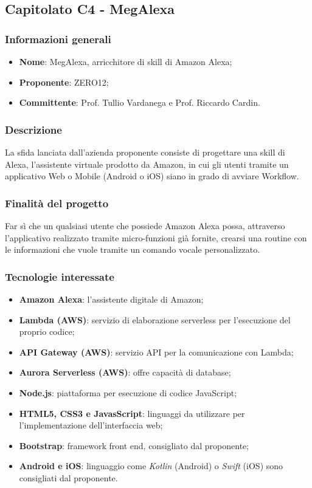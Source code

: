 \subsection{Capitolato C4 - MegAlexa}
\subsubsection{Informazioni generali}
\begin{itemize}
	\item \textbf{Nome}: MegAlexa, arricchitore di skill di Amazon Alexa;
	\item \textbf{Proponente}: ZERO12;
	\item \textbf{Committente}: Prof. Tullio Vardanega e Prof. Riccardo Cardin.
\end{itemize}
\subsubsection{Descrizione}
La sfida lanciata dall’azienda proponente consiste di progettare una skill di Alexa, l’assistente virtuale prodotto da Amazon, in cui gli utenti tramite un applicativo Web o Mobile (Android o iOS) siano in grado di avviare Workflow.
\subsubsection{Finalità del progetto}
Far sì che un qualsiasi utente che possiede Amazon Alexa possa, attraverso l’applicativo realizzato tramite micro-funzioni già fornite, crearsi una routine con le informazioni che vuole tramite un comando vocale personalizzato.
\subsubsection{Tecnologie interessate}
\begin{itemize}
	\item \textbf{Amazon Alexa}: l'assistente digitale di Amazon;
	\item \textbf{Lambda (AWS)}: servizio di elaborazione serverless per l'esecuzione del proprio codice; 
	\item \textbf{API Gateway (AWS)}: servizio API per la comunicazione con Lambda;
	\item \textbf{Aurora Serverless (AWS)}: offre capacità di database;
	\item \textbf{Node.js}: piattaforma per esecuzione di codice JavaScript;
	\item \textbf{HTML5, CSS3 e JavasScript}: linguaggi da utilizzare per l'implementazione dell'interfaccia web;
	\item \textbf{Bootstrap}: framework front end, consigliato dal proponente;
	\item \textbf{Android e iOS}: linguaggio come \textit{Kotlin} (Android) o \textit{Swift} (iOS) sono consigliati dal proponente.
\end{itemize}
